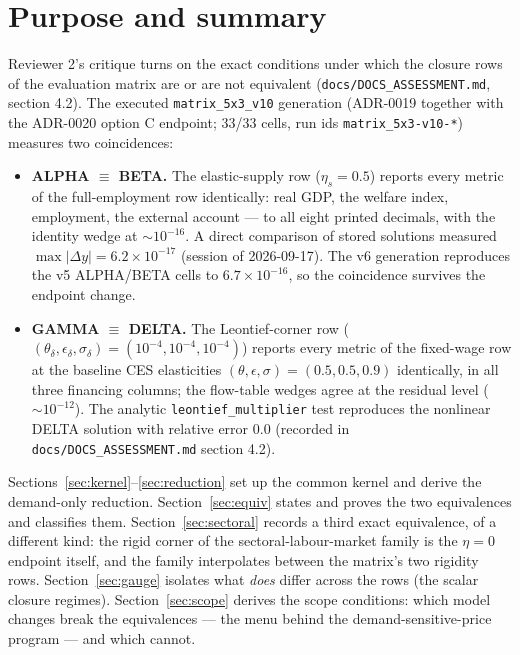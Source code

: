\documentclass[11pt]{article}
\numberwithin{equation}{section}
\begin{document}
\section{Purpose and summary}

Reviewer 2's critique turns on the exact conditions under which the closure
rows of the evaluation matrix are or are not equivalent
(\texttt{docs/DOCS\_ASSESSMENT.md}, section 4.2). The executed
\textcolor{revisionV3}{\texttt{matrix\_5x3\_v10}} generation (ADR-0019 \textcolor{revisionV1}{together
with the ADR-0020 option C endpoint}; \textcolor{revisionV3}{33/33 cells, run ids
\texttt{matrix\_5x3-v10-*}}) measures two coincidences:

\begin{itemize}
\item \textbf{ALPHA $\equiv$ BETA.} The elastic-supply row
      ($\eta_s = 0.5$) reports every metric of the full-employment row
      identically: real GDP, the welfare index, employment, the external
      account --- to all eight printed decimals, with the identity wedge at
      $\sim 10^{-16}$. A direct comparison of stored solutions measured
      $\max|\Delta y| = 6.2\times 10^{-17}$ (session of 2026-09-17).
      \textcolor{revisionV1}{The v6 generation reproduces the v5 ALPHA/BETA
      cells to $6.7\times 10^{-16}$, so the coincidence survives the endpoint
      change.}
\item \textbf{GAMMA $\equiv$ DELTA.} The Leontief-corner row
      ($( \theta_\delta, \epsilon_\delta, \sigma_\delta ) = (10^{-4},
      10^{-4}, 10^{-4})$) reports every metric of the fixed-wage row at the
      baseline CES elasticities $(\theta,\epsilon,\sigma) = (0.5,0.5,0.9)$
      identically, in all three financing columns; the flow-table wedges
      agree at the residual level ($\sim 10^{-12}$). The analytic
      \texttt{leontief\_multiplier} test reproduces the nonlinear DELTA
      solution with relative error $0.0$ (recorded in
      \texttt{docs/DOCS\_ASSESSMENT.md} section 4.2).
\end{itemize}

Sections~\ref{sec:kernel}--\ref{sec:reduction} set up the common kernel and
derive the demand-only reduction. Section~\ref{sec:equiv} states and proves
the two equivalences and classifies them.
\textcolor{revisionV2}{Section~\ref{sec:sectoral} records a third exact
equivalence, of a different kind: the rigid corner of the sectoral-labour-market
family is the $\eta = 0$ endpoint itself, and the family interpolates between the
matrix's two rigidity rows.} Section~\ref{sec:gauge} isolates
what \emph{does} differ across the rows (the scalar closure regimes).
Section~\ref{sec:scope} derives the scope conditions: which model changes
break the equivalences --- the menu behind the demand-sensitive-price program
--- and which cannot.
\end{document}
